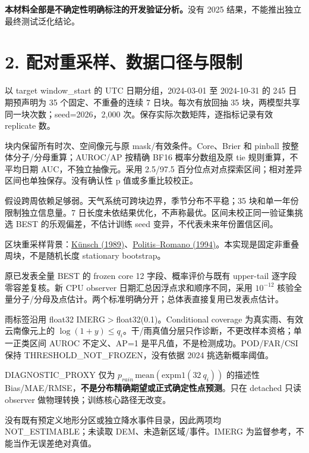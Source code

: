 \documentclass[UTF8,a4paper,10pt,fontset=windows]{ctexart}
\begin{document}
\textbf{本材料全部是不确定性明确标注的开发验证分析。}没有 2025 结果，不能推出独立最终测试泛化结论。
\newpage
\section*{2. 配对重采样、数据口径与限制}
以 target window\_start 的 UTC 日期分组，2024-03-01 至 2024-10-31 的 245 日期预声明为 35 个固定、不重叠的连续 7 日块。每次有放回抽 35 块，两模型共享同一块次数；seed=2026，2,000 次。保存实际次数矩阵，逐指标记录有效 replicate 数。

块内保留所有时次、空间像元与原 mask/有效条件。Core、Brier 和 pinball 按整体分子/分母重算；AUROC/AP 按精确 BF16 概率分数组及原 tie 规则重算，不平均日期 AUC，不独立抽像元。采用 2.5/97.5 百分位点对点探索区间；相对差异区间也单独保存。没有确认性 p 值或多重比较校正。

假设跨周依赖足够弱。天气系统可跨块边界，季节分布不平稳；35 块和单一年份限制独立信息量。7 日长度未依结果优化，不声称最优。区间未校正同一验证集挑选 BEST 的乐观偏差，不估计训练 seed 变异，不代表未来年份置信区间。

区块重采样背景：\href{https://doi.org/10.1214/aos/1176347265}{Künsch (1989)}、\href{https://www.tandfonline.com/doi/abs/10.1080/01621459.1994.10476870}{Politis--Romano (1994)}。本实现是固定非重叠周块，不是随机长度 stationary bootstrap。

原已发表全量 BEST 的 frozen core 12 字段、概率评价与既有 upper-tail 逐字段零容差复核。新 CPU observer 日期汇总因浮点求和顺序不同，采用 $10^{-12}$ 核验全量分子/分母及点估计。两个标准明确分开；总体表直接复用已发表点估计。

雨标签沿用 float32 IMERG$>$float32(0.1)。Conditional coverage 为真实雨、有效云南像元上的 $\log(1+y)\le q_i$。干/雨真值分层只作诊断，不更改样本资格；单一正类区间 AUROC 不定义、AP=1 是平凡值，不是检测成功。POD/FAR/CSI 保持 THRESHOLD\_NOT\_FROZEN，没有依据 2024 挑选新概率阈值。

DIAGNOSTIC\_PROXY 仅为 $p_{rain}\,\mathrm{mean}(\mathrm{expm1}(32\ q_i))$ 的描述性 Bias/MAE/RMSE，\textbf{不是分布精确期望或正式确定性点预测}。只在 detached 只读 observer 做物理转换；训练核心路径无改变。

没有既有预定义地形分区或独立降水事件目录，因此两项均 NOT\_ESTIMABLE；未读取 DEM、未造新区域/事件。IMERG 为监督参考，不能当作无误差绝对真值。
\newpage
\end{document}
